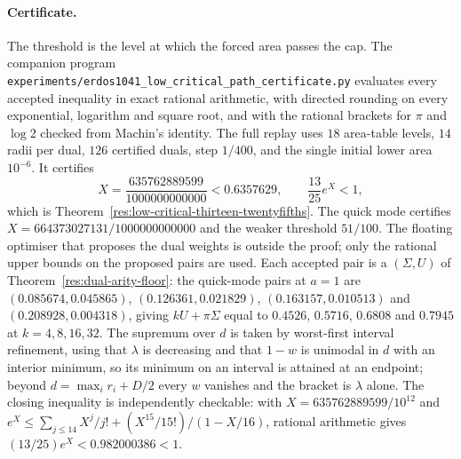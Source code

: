 \paragraph{Certificate.}
The threshold is the level at which the forced area passes the cap.  The
companion program
\texttt{experiments/erdos1041\_low\_critical\_path\_certificate.py} evaluates
every accepted inequality in exact rational arithmetic, with directed rounding
on every exponential, logarithm and square root, and with the rational
brackets for $\pi$ and $\log2$ checked from Machin's identity.  The full
replay uses $18$ area-table levels, $14$ radii per dual, $126$ certified
duals, step $1/400$, and the single initial lower area $10^{-6}$.  It
certifies
\[
 X=\frac{635762889599}{1000000000000}<0.6357629,
 \qquad \frac{13}{25}e^{X}<1,
\]
which is Theorem~\ref{res:low-critical-thirteen-twentyfifths}.  The quick mode
certifies $X=664373027131/1000000000000$ and the weaker threshold $51/100$.
The floating optimiser that proposes the dual weights is outside the proof;
only the rational upper bounds on the proposed pairs are used.  Each accepted
pair is a $(\Sigma,U)$ of Theorem~\ref{res:dual-arity-floor}: the quick-mode
pairs at $a=1$ are
$(0.085674,0.045865)$, $(0.126361,0.021829)$, $(0.163157,0.010513)$ and
$(0.208928,0.004318)$, giving $kU+\pi\Sigma$ equal to
$0.4526$, $0.5716$, $0.6808$ and $0.7945$ at $k=4,8,16,32$.  The supremum over
$d$ is taken by worst-first interval refinement, using that $\lambda$ is
decreasing and that $1-w$ is unimodal in $d$ with an interior minimum, so its
minimum on an interval is attained at an endpoint; beyond
$d=\max_ir_i+D/2$ every $w$ vanishes and the bracket is $\lambda$ alone.
The closing inequality is independently checkable: with
$X=635762889599/10^{12}$ and
$e^X\le\sum_{j\le14}X^j/j!+(X^{15}/15!)/(1-X/16)$, rational arithmetic gives
$(13/25)e^X<0.982000386<1$.

